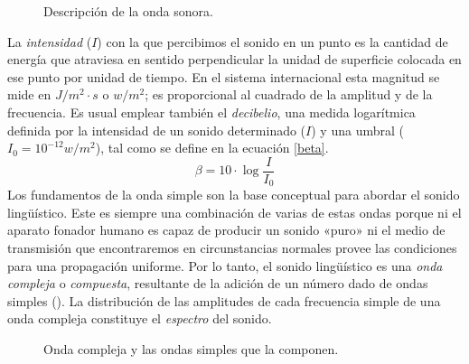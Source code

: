 \begin{figure}[!ht]
	\centering
	\begin{subfigure}{0.42\textwidth}
		
		\label{fig:pendulo}
	\end{subfigure}
	\begin{subfigure}{0.4\textwidth}
		
		\label{fig:onda}
	\end{subfigure}
	\label{fig:ondapen}
	\caption{Descripción de la onda sonora.}
\end{figure}

La \textit{intensidad} ($I$) con la que percibimos el sonido en un punto es la cantidad de energía que atraviesa en sentido perpendicular la unidad de superficie colocada en ese punto por unidad de tiempo. En el sistema internacional esta magnitud se mide en $J/m^2 \cdot s$ o $w/m^2$; es proporcional al cuadrado de la amplitud y de la frecuencia. Es usual emplear también el \textit{decibelio}, una medida logarítmica definida por la intensidad de un sonido determinado ($I$) y una umbral ($I_0=10^{-12} w/m^2$), tal como se define en la ecuación \ref{beta}.
\begin{equation}\label{beta}
	\beta = 10 \cdot \log{\frac{I}{I_0}}
\end{equation}
Los fundamentos de la onda simple son la base conceptual para abordar el sonido lingüístico. Este es siempre una combinación de varias de estas ondas porque ni el aparato fonador humano es capaz de producir un sonido «puro» ni el medio de transmisión que encontraremos en circunstancias normales provee las condiciones para una propagación uniforme. Por lo tanto, el sonido lingüístico es una \textit{onda compleja} o \textit{compuesta}, resultante de la adición de un número dado de ondas simples (). La distribución de las amplitudes de cada frecuencia simple de una onda compleja constituye el \textit{espectro} del sonido.

\begin{figure}[!ht]
	\centering
	
	\caption{Onda compleja y las ondas simples que la componen.}
	\label{fig:ondacompleja}
\end{figure}

